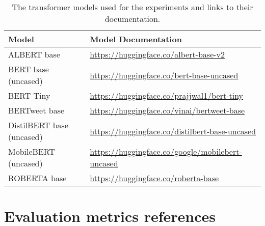 \begin{table}[ht]
    \captionsetup{font=small}
    \centering
    \begin{tabularx}{\textwidth}{|l|X|}
        \hline
        \rowcolor[gray]{0.7}
        \textbf{Model}            & \textbf{Model Documentation}                                   \\
        \hline

        ALBERT base               & \small{\url{https://huggingface.co/albert-base-v2}}            \\
        \hline
        BERT base (uncased)       & \small{\url{https://huggingface.co/bert-base-uncased}}         \\
        \hline
        BERT Tiny                 & \small{\url{https://huggingface.co/prajjwal1/bert-tiny}}       \\
        \hline
        BERTweet base             & \small{\url{https://huggingface.co/vinai/bertweet-base}}       \\
        \hline
        DistilBERT base (uncased) & \small{\url{https://huggingface.co/distilbert-base-uncased}}   \\
        \hline
        MobileBERT (uncased)      & \small{\url{https://huggingface.co/google/mobilebert-uncased}} \\
        \hline
        ROBERTA base              & \small{\url{https://huggingface.co/roberta-base}}              \\
        \hline
    \end{tabularx}
    \caption{The transformer models used for the experiments and links to their documentation.}
    \label{tab: apdx_model_doc}
\end{table}

\section{Evaluation metrics references}

